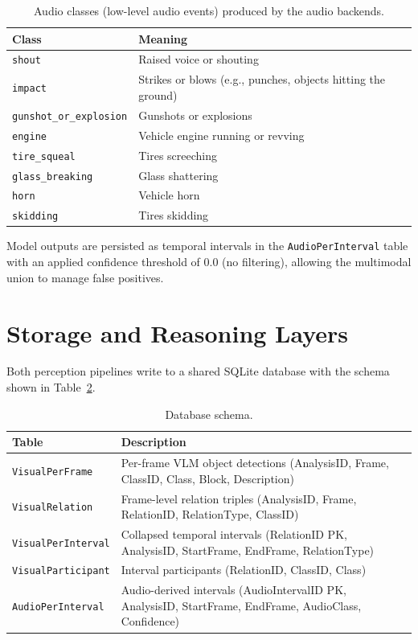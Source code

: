 \begin{table}[h]
  \centering
  \caption{Audio classes (low-level audio events) produced by the audio backends.}
  \label{tab:audio_classes}
  \begin{tabular}{@{}p{12em}p{16em}@{}}
    \toprule
    Class & Meaning \\
    \midrule
    \texttt{shout} & Raised voice or shouting \\
    \addlinespace
    \texttt{impact} & Strikes or blows (e.g., punches, objects hitting the ground) \\
    \addlinespace
    \texttt{gunshot\_or\_explosion} & Gunshots or explosions \\
    \addlinespace
    \texttt{engine} & Vehicle engine running or revving \\
    \addlinespace
    \texttt{tire\_squeal} & Tires screeching \\
    \addlinespace
    \texttt{glass\_breaking} & Glass shattering \\
    \addlinespace
    \texttt{horn} & Vehicle horn \\
    \addlinespace
    \texttt{skidding} & Tires skidding \\
    \bottomrule
  \end{tabular}
\end{table}

Model outputs are persisted as temporal intervals in the \texttt{AudioPerInterval} table with an applied confidence threshold of 0.0 (no filtering), allowing the multimodal union to manage false positives.

\section{Storage and Reasoning Layers}
\label{sec:storage-reasoning}

Both perception pipelines write to a shared SQLite database with the schema shown in Table~\ref{tab:schema}.

\begin{table}[h]
  \centering
  \caption{Database schema.}
  \label{tab:schema}
  \begin{tabular}{lp{8cm}}
    \toprule
    Table & Description \\
    \midrule
    \texttt{VisualPerFrame} & Per-frame VLM object detections (AnalysisID, Frame, ClassID, Class, Block, Description) \\
    \texttt{VisualRelation} & Frame-level relation triples (AnalysisID, Frame, RelationID, RelationType, ClassID) \\
    \texttt{VisualPerInterval} & Collapsed temporal intervals (RelationID PK, AnalysisID, StartFrame, EndFrame, RelationType) \\
    \texttt{VisualParticipant} & Interval participants (RelationID, ClassID, Class) \\
    \texttt{AudioPerInterval} & Audio-derived intervals (AudioIntervalID PK, AnalysisID, StartFrame, EndFrame, AudioClass, Confidence) \\
    \bottomrule
  \end{tabular}
\end{table}

